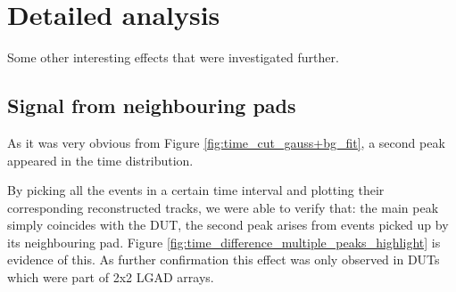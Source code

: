 \begin{figure}[h!tbp]
    \centering
    \hfill
    \vfill
    \begin{minipage}[c]{.47\linewidth}
    \end{minipage}
    \hfill
    \begin{minipage}[c]{.5\linewidth}
    \end{minipage}
\end{figure}

\FloatBarrier

\section{Detailed analysis}\label{sec:detailed_analysis}

Some other interesting effects that were investigated further.

\subsection{Signal from neighbouring pads}\label{sec:multiple_peaks}

As it was very obvious from Figure \ref{fig:time_cut_gauss+bg_fit}, a second peak appeared in the time distribution.

By picking all the events in a certain time interval and plotting their corresponding reconstructed tracks, we were able to verify that: the main peak simply coincides with the DUT, the second peak arises from events picked up by its neighbouring pad. Figure \ref{fig:time_difference_multiple_peaks_highlight} is evidence of this.
As further confirmation this effect was only observed in DUTs which were part of 2x2 LGAD arrays.

